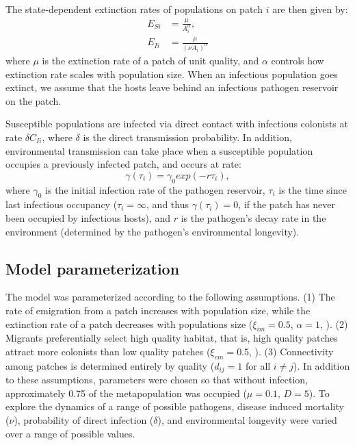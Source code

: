 \documentclass{article}
\begin{document}
The state-dependent extinction rates of populations on patch $i$ are then given by:
\begin{align}
E_{Si} & =\frac{\mu}{A_i^\alpha},\\
E_{Ii} & = \frac{\mu}{(\nu A_i) ^ \alpha}
\end{align}
where $\mu$ is the extinction rate of a patch of unit quality, and $\alpha$ controls how extinction rate scales with population size.  When an infectious population goes extinct, we assume that the hosts leave behind an infectious pathogen reservoir on the patch.  

Susceptible populations are infected via direct contact with infectious colonists at rate $\delta C_{Ii}$, where $\delta$ is the direct transmission probability.  In addition, environmental transmission can take place when a susceptible population occupies a previously infected patch, and occurs at rate:
\begin{equation}
\gamma(\tau_i)=\gamma_0exp(-r\tau_{i}),
\end{equation}
where $\gamma_0$ is the initial infection rate of the pathogen reservoir, $\tau_{i}$ is the time since last infectious occupancy ($\tau_{i} = \infty$, and thus $\gamma(\tau_i) = 0$, if the patch has never been occupied by infectious hosts), and $r$ is the pathogen's decay rate in the environment (determined by the pathogen's environmental longevity).

\subsection{Model parameterization}

The model was parameterized  according to the following assumptions. (1) The rate of emigration from a patch increases with population size, while the extinction rate of a patch decreases with populations size ($\xi_{im}=0.5$, $\alpha=1$, \cite{Hanski2003}).  (2) Migrants preferentially select high quality habitat, that is, high quality patches attract more colonists than low quality patches ($\xi_{em}=0.5$, \cite{Hanski2003}).  (3)  Connectivity among patches is determined entirely by quality ($d_{ij}=1$ for all $i \neq j$).  In addition to these assumptions, parameters were chosen so that without infection, approximately 0.75 of the metapopulation was occupied ($\mu = 0.1$, $D=5$).  To explore the dynamics of a range of possible pathogens, disease induced mortality ($\nu$), probability of direct infection ($\delta$), and environmental longevity were varied over a range of possible values.
\end{document}
